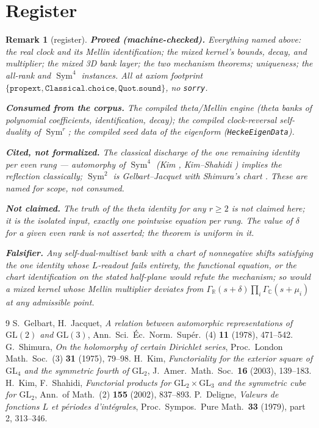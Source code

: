 \documentclass[11pt]{article}
\newtheorem{remark}[theorem]{Remark}
\newcommand{\Sym}{\operatorname{Sym}}
\newcommand{\Gm}{\Gamma_{\mathbb C}}
\newcommand{\Gr}{\Gamma_{\mathbb R}}
\begin{document}
\section{Register}

\begin{remark}[register]
\textbf{Proved (machine-checked).}  Everything named above: the real clock and its
Mellin identification; the mixed kernel's bounds, decay, and multiplier; the mixed 3D
bank layer; the two mechanism theorems; uniqueness; the all-rank and $\Sym^4$
instances.  All at axiom footprint
$\{\texttt{propext},\texttt{Classical.choice},\texttt{Quot.sound}\}$, no
\texttt{sorry}.

\textbf{Consumed from the corpus.}  The compiled theta/Mellin engine (theta banks of
polynomial coefficients, identification, decay); the compiled clock-reversal
self-duality of $\Sym^r$; the compiled seed data of the eigenform
(\texttt{HeckeEigenData}).

\textbf{Cited, not formalized.}  The classical discharge of the one remaining identity
per even rung --- automorphy of $\Sym^4$ (Kim \cite{Kim}, Kim--Shahidi
\cite{KimShahidi}) implies the reflection classically; $\Sym^2$ is Gelbart--Jacquet
\cite{GJ} with Shimura's chart \cite{Shimura}.  These are named for scope, not
consumed.

\textbf{Not claimed.}  The truth of the theta identity for any $r\ge2$ is not claimed
here; it is the isolated input, exactly one pointwise equation per rung.  The value of
$\delta$ for a given even rank is not asserted; the theorem is uniform in it.

\textbf{Falsifier.}  Any self-dual-multiset bank with a chart of nonnegative shifts
satisfying the one identity whose $L$-readout fails entirety, the functional equation,
or the chart identification on the stated half-plane would refute the mechanism; so
would a mixed kernel whose Mellin multiplier deviates from
$\Gr(s+\delta)\prod_i\Gm(s+\mu_i)$ at any admissible point.
\end{remark}

\begin{thebibliography}{9}
 S.~Gelbart, H.~Jacquet,
\emph{A relation between automorphic representations of $\mathrm{GL}(2)$ and
$\mathrm{GL}(3)$}, Ann.\ Sci.\ \'Ec.\ Norm.\ Sup\'er.\ (4) \textbf{11} (1978), 471--542.
 G.~Shimura,
\emph{On the holomorphy of certain Dirichlet series},
Proc.\ London Math.\ Soc.\ (3) \textbf{31} (1975), 79--98.
 H.~Kim,
\emph{Functoriality for the exterior square of $\mathrm{GL}_4$ and the symmetric fourth
of $\mathrm{GL}_2$}, J.\ Amer.\ Math.\ Soc.\ \textbf{16} (2003), 139--183.
 H.~Kim, F.~Shahidi,
\emph{Functorial products for $\mathrm{GL}_2\times\mathrm{GL}_3$ and the symmetric cube
for $\mathrm{GL}_2$}, Ann.\ of Math.\ (2) \textbf{155} (2002), 837--893.
 P.~Deligne,
\emph{Valeurs de fonctions $L$ et p\'eriodes d'int\'egrales},
Proc.\ Sympos.\ Pure Math.\ \textbf{33} (1979), part 2, 313--346.
\end{thebibliography}
\end{document}
